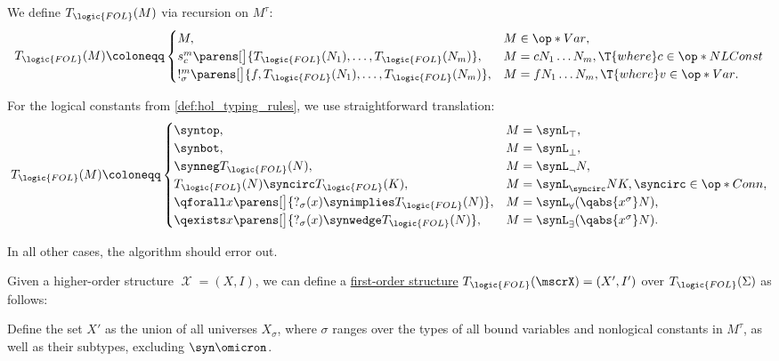 \begin{algorithm}
\begin{thmenum}
     We define \( T_{\logic{FOL}}(M) \) via recursion on \( M^\tau \):
    \begin{equation*}
      T_{\logic{FOL}}(M) \coloneqq \begin{cases}
        M,                                                                                &M \in \op*{Var}, \\
        s_c^m\parens[\big]{ T_{\logic{FOL}}(N_1), \ldots, T_{\logic{FOL}}(N_m) },         &M = c N_1 \ldots N_m, \T{where} c \in \op*{NLConst} \\
        !_\sigma^m\parens[\big]{ f, T_{\logic{FOL}}(N_1), \ldots, T_{\logic{FOL}}(N_m) }, &M = f N_1 \ldots N_m, \T{where} v \in \op*{Var}.
      \end{cases}
    \end{equation*}

    For the logical constants from \cref{def:hol_typing_rules}, we use straightforward translation:
    \begin{equation*}
      T_{\logic{FOL}}(M) \coloneqq \begin{cases}
        \syntop,                                                                  &M = \synL_\top, \\
        \synbot,                                                                  &M = \synL_\bot, \\
        \synneg T_{\logic{FOL}}(N),                                               &M = \synL_\neg N, \\
        T_{\logic{FOL}}(N) \syncirc T_{\logic{FOL}}(K),                           &M = \synL_{\syncirc} N K, {\syncirc} \in \op*{Conn}, \\
        \qforall x \parens[\big]{ ?_\sigma(x) \synimplies T_{\logic{FOL}}(N) },   &M = \synL_\forall (\qabs {x^\sigma} N), \\
        \qexists x \parens[\big]{ ?_\sigma(x) \synwedge T_{\logic{FOL}}(N) },     &M = \synL_\exists (\qabs {x^\sigma} N).
      \end{cases}
    \end{equation*}

    In all other cases, the algorithm should error out.

     Given a higher-order structure \( \mscrX = (X, I) \), we can define a \hyperref[def:fol_structure]{first-order structure} \( T_{\logic{FOL}}(\mscrX) = (X', I') \) over \( T_{\logic{FOL}}(\Sigma) \) as follows:
    \begin{thmenum}
       Define the set \( X' \) as the union of all universes \( X_\sigma \), where \( \sigma \) ranges over the types of all bound variables and nonlogical constants in \( M^\tau \), as well as their subtypes, excluding \( \syn\omicron \).


\end{thmenum}
\end{thmenum}
\end{algorithm}
